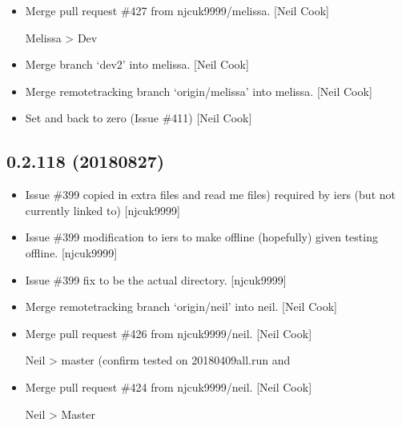 \documentclass[a4paper,10pt,english]{report}
\begin{document}
\begin{itemize}
\item {} 
Merge pull request \#427 from njcuk9999/melissa. {[}Neil Cook{]}

Melissa \textendash{}\textgreater{} Dev

\item {} 
Merge branch ‘dev2’ into melissa. {[}Neil Cook{]}

\item {} 
Merge remote\sphinxhyphen{}tracking branch ‘origin/melissa’ into melissa. {[}Neil
Cook{]}

\item {} 
Set  and  back to zero (Issue \#411)
{[}Neil Cook{]}

\end{itemize}


\subsection{0.2.118 (2018\sphinxhyphen{}08\sphinxhyphen{}27)}
\label{\detokenize{misc/changelog:id367}}\begin{itemize}
\item {} 
Issue \#399 \sphinxhyphen{} copied in extra files  and read me files) required
by iers (but not currently linked to) {[}njcuk9999{]}

\item {} 
Issue \#399 \sphinxhyphen{} modification to iers to make offline (hopefully) given
testing offline. {[}njcuk9999{]}

\item {} 
Issue \#399 \sphinxhyphen{} fix  to be the actual directory.
{[}njcuk9999{]}

\item {} 
Merge remote\sphinxhyphen{}tracking branch ‘origin/neil’ into neil. {[}Neil Cook{]}

\item {} 
Merge pull request \#426 from njcuk9999/neil. {[}Neil Cook{]}

Neil \textendash{}\textgreater{} master (confirm tested on 20180409all.run and 

\item {} 
Merge pull request \#424 from njcuk9999/neil. {[}Neil Cook{]}

Neil \textendash{}\textgreater{} Master

\end{itemize}
\end{document}
